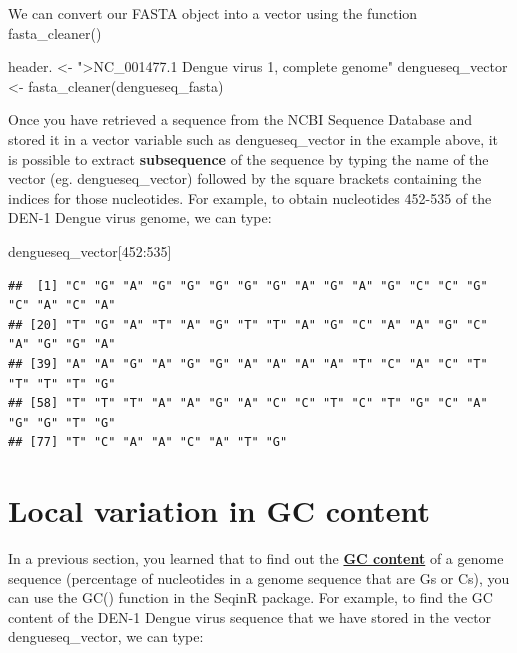 \documentclass[
]{book}
\newenvironment{Shaded}{\begin{snugshade}}{\end{snugshade}}
\newcommand{\DecValTok}[1]{\textcolor[rgb]{0.00,0.00,0.81}{#1}}
\newcommand{\FunctionTok}[1]{\textcolor[rgb]{0.00,0.00,0.00}{#1}}
\newcommand{\NormalTok}[1]{#1}
\newcommand{\OtherTok}[1]{\textcolor[rgb]{0.56,0.35,0.01}{#1}}
\newcommand{\SpecialCharTok}[1]{\textcolor[rgb]{0.00,0.00,0.00}{#1}}
\newcommand{\StringTok}[1]{\textcolor[rgb]{0.31,0.60,0.02}{#1}}
\begin{document}
We can convert our FASTA object into a vector using the function fasta\_cleaner()

\begin{Shaded}
\begin{Highlighting}[]
\NormalTok{header. }\OtherTok{\textless{}{-}} \StringTok{"\textgreater{}NC\_001477.1 Dengue virus 1, complete genome"}
\NormalTok{dengueseq\_vector }\OtherTok{\textless{}{-}} \FunctionTok{fasta\_cleaner}\NormalTok{(dengueseq\_fasta)}
\end{Highlighting}
\end{Shaded}

Once you have retrieved a sequence from the NCBI Sequence Database and stored it in a vector variable such as dengueseq\_vector in the example above, it is possible to extract \textbf{subsequence} of the sequence by typing the name of the vector (eg. dengueseq\_vector) followed by the square brackets containing the indices for those nucleotides. For example, to obtain nucleotides 452-535 of the DEN-1 Dengue virus genome, we can type:

\begin{Shaded}
\begin{Highlighting}[]
\NormalTok{dengueseq\_vector[}\DecValTok{452}\SpecialCharTok{:}\DecValTok{535}\NormalTok{]}
\end{Highlighting}
\end{Shaded}

\begin{verbatim}
##  [1] "C" "G" "A" "G" "G" "G" "G" "G" "A" "G" "A" "G" "C" "C" "G" "C" "A" "C" "A"
## [20] "T" "G" "A" "T" "A" "G" "T" "T" "A" "G" "C" "A" "A" "G" "C" "A" "G" "G" "A"
## [39] "A" "A" "G" "A" "G" "G" "A" "A" "A" "A" "T" "C" "A" "C" "T" "T" "T" "T" "G"
## [58] "T" "T" "T" "A" "A" "G" "A" "C" "C" "T" "C" "T" "G" "C" "A" "G" "G" "T" "G"
## [77] "T" "C" "A" "A" "C" "A" "T" "G"
\end{verbatim}

\hypertarget{local-variation-in-gc-content-1}{%
\section{Local variation in GC content}\label{local-variation-in-gc-content-1}}

In a previous section, you learned that to find out the \href{https://en.wikipedia.org/wiki/GC-content}{\textbf{GC content}} of a genome sequence (percentage of nucleotides in a genome sequence that are Gs or Cs), you can use the GC() function in the SeqinR package. For example, to find the GC content of the DEN-1 Dengue virus sequence that we have stored in the vector dengueseq\_vector, we can type:
\end{document}
